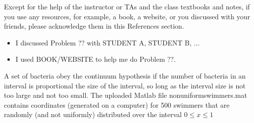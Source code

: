 \documentclass[addpoints, 11pt]{exam}
\begin{document}
 Except for the help of the instructor or TAs and the class textbooks and notes, if you use any resources, for example, a book, a website, or you discussed with your friends, please acknowledge them in this References section. 
\begin{itemize}
\item I discussed Problem ?? with STUDENT A, STUDENT B, $\ldots$
\item I used BOOK/WEBSITE to help me do Problem ??.
\end{itemize}
\vspace{.05cm}
\begin{questions}
\question  A set of bacteria obey the continuum hypothesis if the number of bacteria in an interval is proportional the size of the interval, so long as the interval size is not too large and not too small. The uploaded Matlab file nonuniformswimmers.mat contains coordinates (generated on a computer) for 500 swimmers that are randomly (and not uniformly) distributed over the interval $0 \leq x \leq 1$
\end{questions}
\end{document}
